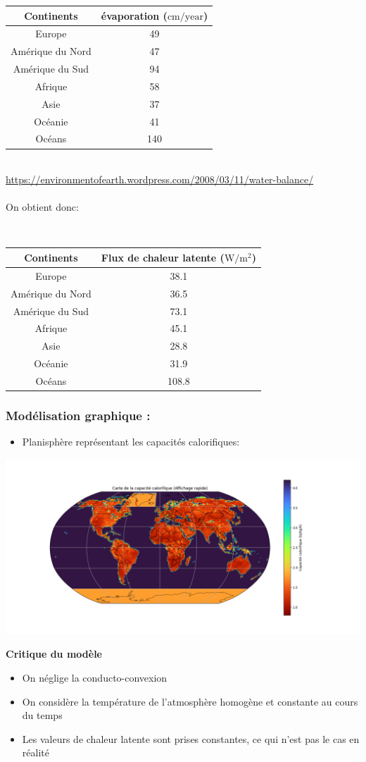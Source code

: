 \documentclass[a4paper,12pt]{article}
\begin{document}
\begin{tabular}{|c|c|}
\hline
Continents & évaporation ($\mathrm{cm/year}$) \\
\hline
Europe & 49 \\
\hline
Amérique du Nord & 47 \\
\hline
Amérique du Sud & 94 \\
\hline
Afrique & 58 \\
\hline
Asie & 37 \\
\hline
Océanie & 41 \\
\hline
Océans & 140 \\
\hline
\end{tabular}
\\
\url{https://environmentofearth.wordpress.com/2008/03/11/water-balance/}
\\
\\
On obtient donc:

\\
\begin{tabular}{|c|c|}
\hline
Continents & Flux de chaleur latente ($\mathrm{W/m^2}$) \\
\hline
Europe & 38.1 \\
\hline
Amérique du Nord & 36.5 \\
\hline
Amérique du Sud & 73.1 \\
\hline
Afrique & 45.1 \\
\hline
Asie & 28.8 \\
\hline
Océanie & 31.9 \\
\hline
Océans & 108.8 \\
\hline
\end{tabular}

\subsubsection*{Modélisation graphique  :} 
\begin{itemize}
    \item Planisphère représentant les capacités calorifiques: 
\end{itemize}
\includegraphics[width=0.8\linewidth]{modele4/figures/c_humidite.png}



\textbf{Critique du modèle}
\begin{itemize}
    \item On néglige la conducto-convexion
    \item On considère la température de l'atmosphère homogène et constante au cours du temps
    \item Les valeurs de chaleur latente sont prises constantes, ce qui n'est pas le cas en réalité
\end{itemize}
\end{document}
